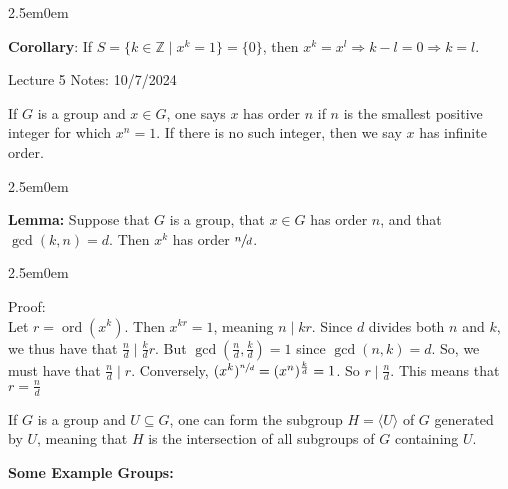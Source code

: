 \documentclass{book}
\newcommand{\hTwo}{%
\color{MidnightBlue}%
   \fontsize{13}{15}\selectfont%
}
\newcommand{\hThree}{%
   \color{PineGreen!85!Orange}
   \fontsize{12}{14}\selectfont%
}
\newcommand{\exOne}{%
   \color{Purple}%
   \fontsize{13}{15}\selectfont%
}
\newenvironment{myIndent}{%
   \begin{adjustwidth}{2.5em}{0em}%
}{%
   \end{adjustwidth}%
}
\newcommand{\blab}[1]{\textbf{#1}}
\newcommand{\divides}{\mathop{\mid}}
\DeclareMathOperator{\ord}{ord}
\newcommand{\retTwo}{\hfill\bigbreak}
\newcommand{\mHeader}[1]{{
   \color{Black}%
   \fontsize{20}{18}\selectfont%
   #1\retTwo
}}
\begin{document}
\newpage

\begin{myIndent}\hTwo
	\blab{Corollary}: If $S = \{k \in \mathbb{Z} \mid x^k = 1\} = \{0\}$, then $x^{k} = x^{l} \Longrightarrow k-l = 0 \Longrightarrow k = l$.\retTwo 
\end{myIndent}

\mHeader{Lecture 5 Notes: 10/7/2024}

If $G$ is a group and $x \in G$, one says $x$ has order $n$ if $n$ is the smallest positive integer for which $x^n = 1$. If there is no such integer, then we say $x$ has infinite order.\retTwo


\begin{myIndent}\hTwo
	\blab{Lemma:} Suppose that $G$ is a group, that $x \in G$ has order $n$, and that $\gcd(k , n) = d$. Then $x^k$ has order $\sfrac{n}{d}$.

	\begin{myIndent}\hThree
		Proof:\\
		Let $r = \ord(x^k)$. Then $x^{kr} = 1$, meaning $n \divides kr$. Since $d$ divides both $n$ and $k$, we thus have that $\frac{n}{d} \divides \frac{k}{d} r$. But $\gcd(\frac{n}{d}, \frac{k}{d}) = 1$ since $\gcd(n , k) = d$. So, we must have that $\frac{n}{d} \divides r$. Conversely, $(x^k)^{\sfrac{n}{d}} = (x^n)^{\frac{k}{d}} = 1$. So $r \divides \frac{n}{d}$. This means that $r = \frac{n}{d}$\retTwo
	\end{myIndent}
\end{myIndent}

If $G$ is a group and $U \subseteq G$, one can form the subgroup $H = \langle U\rangle$ of $G$ generated by $U$, meaning that $H$ is the intersection of all subgroups of $G$ containing $U$.\retTwo

\exOne\blab{Some Example Groups:}
\end{document}
